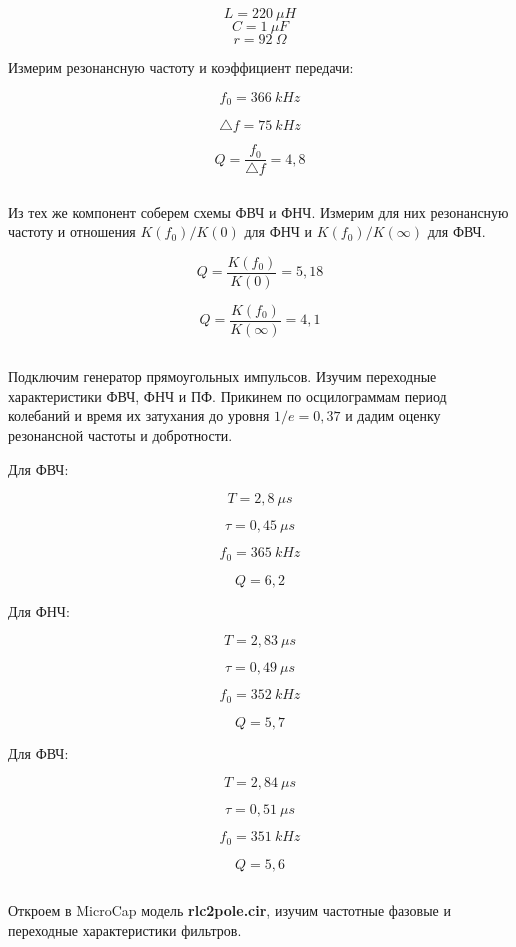\documentclass{article}
\begin{document}
\[L = 220 \: \mu H\]
\[C = 1 \: \mu F\]
\[r = 92 \: \Omega\]

Измерим резонансную частоту и коэффициент передачи:

\[f_0 = 366 \: kHz\]

\[\triangle f = 75 \: kHz\]

\[Q = \frac{f_0}{\triangle f} = 4,8\]

\subsection{}
Из тех же компонент соберем схемы ФВЧ и ФНЧ. Измерим для них резонансную частоту и отношения $K(f_0)/K(0)$ для ФНЧ и $K(f_0)/K(\infty)$ для ФВЧ.

\[Q = \frac{K(f_0)}{K(0)} = 5,18\]

\[Q = \frac{K(f_0)}{K(\infty)} = 4,1\]

\subsection{}
Подключим генератор прямоугольных импульсов. Изучим переходные характеристики ФВЧ, ФНЧ и ПФ. Прикинем по осцилограммам период колебаний и время их затухания до уровня $1/e = 0,37$ и дадим оценку резонансной частоты и добротности.

Для ФВЧ:

\[T = 2,8 \: \mu s\]

\[\tau = 0,45 \: \mu s\]

\[f_0 = 365 \: kHz\]

\[Q = 6,2\]

Для ФНЧ:

\[T = 2,83 \: \mu s\]

\[\tau = 0,49 \: \mu s\]

\[f_0 = 352 \: kHz\]

\[Q = 5,7\]

Для ФВЧ:

\[T = 2,84 \: \mu s\]

\[\tau = 0,51 \: \mu s\]

\[f_0 = 351 \: kHz\]

\[Q = 5,6\]

\subsection{}
Откроем в MicroCap модель \textbf{rlc2pole.cir}, изучим частотные фазовые и переходные характеристики фильтров.
\end{document}
